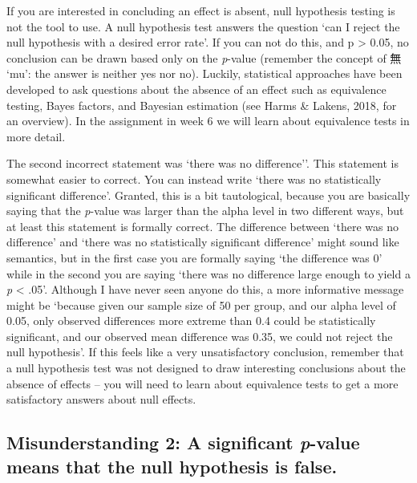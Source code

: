 \documentclass[
]{krantz}
\begin{document}
If you are interested in concluding an effect is absent, null hypothesis testing is not the tool to use. A null hypothesis test answers the question `can I reject the null hypothesis with a desired error rate'. If you can not do this, and p \textgreater{} 0.05, no conclusion can be drawn based only on the \emph{p}-value (remember the concept of 無 `mu': the answer is neither yes nor no). Luckily, statistical approaches have been developed to ask questions about the absence of an effect such as equivalence testing, Bayes factors, and Bayesian estimation (see Harms \& Lakens, 2018, for an overview). In the assignment in week 6 we will learn about equivalence tests in more detail.

The second incorrect statement was `there was no difference''. This statement is somewhat easier to correct. You can instead write `there was no statistically significant difference'. Granted, this is a bit tautological, because you are basically saying that the \emph{p}-value was larger than the alpha level in two different ways, but at least this statement is formally correct. The difference between `there was no difference' and `there was no statistically significant difference' might sound like semantics, but in the first case you are formally saying `the difference was 0' while in the second you are saying `there was no difference large enough to yield a \emph{p} \textless{} .05'. Although I have never seen anyone do this, a more informative message might be `because given our sample size of 50 per group, and our alpha level of 0.05, only observed differences more extreme than 0.4 could be statistically significant, and our observed mean difference was 0.35, we could not reject the null hypothesis'. If this feels like a very unsatisfactory conclusion, remember that a null hypothesis test was not designed to draw interesting conclusions about the absence of effects -- you will need to learn about equivalence tests to get a more satisfactory answers about null effects.

\hypertarget{misunderstanding-2-a-significant-p-value-means-that-the-null-hypothesis-is-false.}{%
\subsection{\texorpdfstring{Misunderstanding 2: A significant \emph{p}-value means that the null hypothesis is false.}{Misunderstanding 2: A significant p-value means that the null hypothesis is false.}}\label{misunderstanding-2-a-significant-p-value-means-that-the-null-hypothesis-is-false.}}
\end{document}
